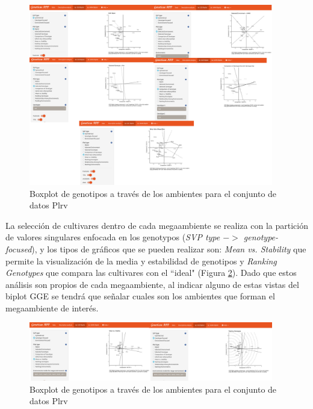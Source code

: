 \begin{figure}[H]
	\begin{center}
		\includegraphics[width=0.95\textwidth]{./Graficos/www/GGE_biplotAPP1.png}
	\end{center}
	\caption{Boxplot de genotipos a través de los ambientes para el conjunto de datos Plrv}
	\label{fig:ggebip1}
\end{figure}

La selección de cultivares dentro de cada megaambiente se realiza con la partición de valores singulares enfocada en los genotypos (\emph{SVP type $->$ genotype-focused}), y los tipos de gráficos que se pueden realizar son: \emph{Mean vs. Stability} que permite la visualización de la media y estabilidad de genotipos y \emph{Ranking Genotypes} que compara las cultivares con el ``ideal" (Figura \ref{fig:ggebip2}). Dado que estos análisis son propios de cada megaambiente, al indicar alguno de estas vistas del biplot GGE se tendrá que señalar cuales son los ambientes que forman el megaambiente de interés. 


\begin{figure}[H]
	\begin{center}
		\includegraphics[width=0.95\textwidth]{./Graficos/www/GGE_biplotAPP2.png}
	\end{center}
	\caption{Boxplot de genotipos a través de los ambientes para el conjunto de datos Plrv}
	\label{fig:ggebip2}
\end{figure}

